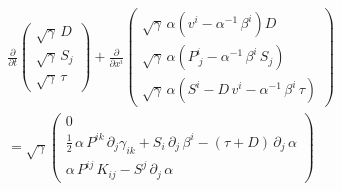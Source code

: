 \documentclass[10pt]{article}
\begin{document}
\begin{align*}\frac{\partial}{\partial t}\begin{pmatrix}\sqrt{\gamma}\,D\\\sqrt{\gamma}\,S_{j}\\\sqrt{\gamma}\,\tau\end{pmatrix}+\frac{\partial}{\partial x^{i}}\begin{pmatrix}\sqrt{\gamma}\,\alpha\left(v^{i}-\alpha^{-1}\,\beta^{i}\right)D\\\sqrt{\gamma}\,\alpha\left(P^{i}_{~j}-\alpha^{-1}\,\beta^{i}\,S_{j}\right)\\\sqrt{\gamma}\,\alpha\left(S^{i}-D\,v^{i}-\alpha^{-1}\,\beta^{i}\,\tau\right)\end{pmatrix}\\=\sqrt{\gamma}\begin{pmatrix}0\\\frac{1}{2}\,\alpha\,P^{ik}\,\partial_{j}\gamma_{ik}+S_{i}\,\partial_{j}\,\beta^{i}-\left(\tau+D\right)\,\partial_{j}\,\alpha\\\alpha\,P^{ij}\,K_{ij}-S^{j}\,\partial_{j}\,\alpha\end{pmatrix}\end{align*}
\end{document}
